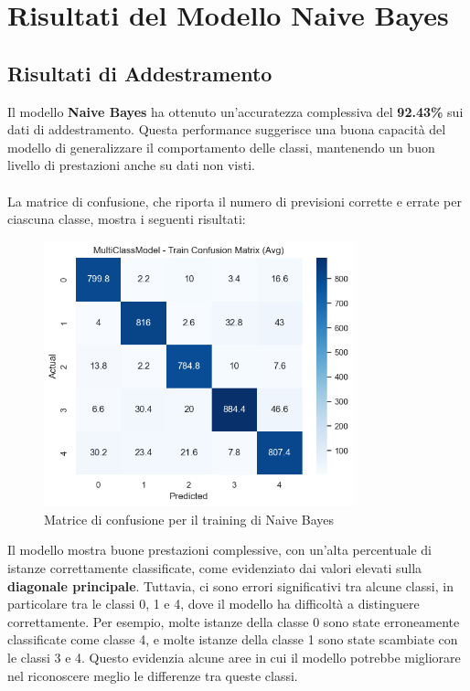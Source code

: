\newpage

\section{Risultati del Modello Naive Bayes}

\subsection{Risultati di Addestramento}

Il modello \textbf{Naive Bayes} ha ottenuto un'accuratezza complessiva del \textbf{92.43\%} sui dati di addestramento. Questa performance suggerisce una buona capacità del modello di generalizzare il comportamento delle classi, mantenendo un buon livello di prestazioni anche su dati non visti. \\ \\
La matrice di confusione, che riporta il numero di previsioni corrette e errate per ciascuna classe, mostra i seguenti risultati:

\begin{figure}[H]
    \centering
    \includegraphics[width=0.8\textwidth]{images/confusion_matrix_train_naive_bayes.png}
    \caption{Matrice di confusione per il training di Naive Bayes}
    \label{fig:confusion_matrix_train_naive_bayes}
\end{figure}

Il modello mostra buone prestazioni complessive, con un'alta percentuale di istanze correttamente classificate, come evidenziato dai valori elevati sulla \textbf{diagonale principale}. Tuttavia, ci sono errori significativi tra alcune classi, in particolare tra le classi 0, 1 e 4, dove il modello ha difficoltà a distinguere correttamente. Per esempio, molte istanze della classe 0 sono state erroneamente classificate come classe 4, e molte istanze della classe 1 sono state scambiate con le classi 3 e 4. Questo evidenzia alcune aree in cui il modello potrebbe migliorare nel riconoscere meglio le differenze tra queste classi.


